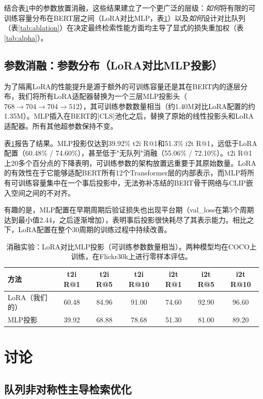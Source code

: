 \documentclass[10pt,a4paper]{ctexart}
\begin{document}
结合表\ref{tab:ablation_mlp}中的参数放置消融，这些结果建立了一个更广泛的层级：\emph{如何}将有限的可训练容量分布在BERT层之间（LoRA对比MLP，表\ref{tab:ablation_mlp}）以及\emph{如何}设计对比队列（表\ref{tab:ablation}）在决定最终检索性能方面均主导了显式的损失重加权（表\ref{tab:alpha}）。

\subsection{参数消融：参数分布（LoRA对比MLP投影）}

为了隔离LoRA的性能提升是源于额外的可训练容量还是其在BERT内的逐层分布，我们将所有LoRA适配器替换为一个三层MLP投影头（$768 \to 704 \to 704 \to 512$），其可训练参数数量相当（约1.40M对比LoRA配置的约1.35M）。MLP插入在BERT的[CLS]池化之后，替换了原始的线性投影头和LoRA适配器。所有其他超参数保持不变。

表\ref{tab:ablation_mlp}报告了结果。MLP投影仅达到39.92\% t2i R@1和51.3\% i2t R@1，远低于LoRA配置（60.48\% / 74.60\%），甚至低于"无队列"消融（55.06\% / 72.10\%）。t2i R@1上20多个百分点的下降表明，可训练参数的架构放置远重要于其原始数量。LoRA的有效性在于它能够适配BERT所有12个Transformer层的内部表示，而MLP将所有可训练容量集中在一个事后投影中，无法弥补冻结的BERT骨干网络与CLIP嵌入空间之间的不对齐。

有趣的是，MLP配置在早期周期后验证损失也出现平台期（val\_loss在第5个周期达到最小值2.44，之后逐渐增加），表明事后投影很快耗尽了其表示能力。相比之下，LoRA配置在整个30周期的训练过程中持续改善。

\begin{table}[htbp]
\centering
\caption{消融实验：LoRA对比MLP投影（可训练参数数量相当）。两种模型均在COCO上训练，在Flickr30k上进行零样本评估。}
\label{tab:ablation_mlp}
\begin{tabular}{lcccccc}
\toprule
方法 & t2i R@1 & t2i R@5 & t2i R@10 & i2t R@1 & i2t R@5 & i2t R@10 \\
\midrule
LoRA（我们的） & 60.48 & 84.96 & 91.00 & 74.60 & 92.90 & 96.60 \\
MLP投影 & 39.92 & 68.88 & 78.68 & 51.30 & 81.00 & 89.20 \\
\bottomrule
\end{tabular}
\end{table}

\section{讨论}

\subsection{队列非对称性主导检索优化}
\end{document}
